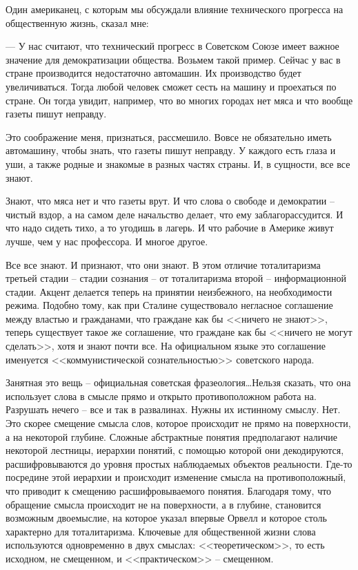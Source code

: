 \documentclass{book}
\begin{document}
Один американец, с которым мы обсуждали влияние технического прогресса на общественную жизнь, сказал мне:

--- У нас считают, что технический прогресс в Советском Союзе имеет важное значение для демократизации общества. Возьмем такой пример. Сейчас у вас в стране производится недостаточно автомашин. Их производство будет увеличиваться. Тогда любой человек сможет сесть на машину и проехаться по стране. Он тогда увидит, например, что во многих городах нет мяса и что вообще газеты пишут неправду.

Это соображение меня, признаться, рассмешило. Вовсе не обязательно иметь автомашину, чтобы знать, что газеты пишут неправду. У каждого есть глаза и уши, а также родные и знакомые в разных частях страны. И, в сущности, все все знают.

Знают, что мяса нет и что газеты врут. И что слова о свободе и демократии -- чистый вздор, а на самом деле начальство делает, что ему заблагорассудится. И что надо сидеть тихо, а то угодишь в лагерь. И что рабочие в Америке живут лучше, чем у нас профессора. И многое другое.

Все все знают. И признают, что они знают. В этом отличие тоталитаризма третьей стадии -- стадии сознания -- от тоталитаризма второй -- информационной стадии. Акцент делается теперь на принятии неизбежного, на необходимости режима. Подобно тому, как при Сталине существовало негласное соглашение между властью и гражданами, что граждане как бы <<ничего не знают>>, теперь существует такое же соглашение, что граждане как бы <<ничего не могут сделать>>, хотя и знают почти все. На официальном языке это соглашение именуется <<комму­нистической сознательностью>> советского народа.

Занятная это вещь -- официальная советская фразеология\ldots Нельзя сказать, что она использует слова в смысле прямо и открыто противоположном работа на.  Разрушать нечего -- все и так в развалинах. Нужны их истинному смыслу. Нет. Это скорее смещение смысла слов, которое происходит не прямо на поверхности, а на некоторой глубине. Сложные абстракт­ные понятия предполагают наличие некоторой лестницы, ие­рархии понятий, с помощью которой они декодируются, рас­шифровываются до уровня простых наблюдаемых объектов реальности. Где-то посредине этой иерархии и происходит изме­нение смысла на противоположный, что приводит к смещению расшифровываемого понятия. Благодаря тому, что обращение смысла происходит не на поверхности, а в глубине, становит­ся возможным двоемыслие,  на которое указал впервые Орвелл и которое столь характерно для тоталитаризма. Ключе­вые для общественной жизни слова используются одновре­менно в двух смыслах: <<теоретическом>>, то есть исходном, не смещенном, и <<практическом>> -- смещенном. 
\end{document}
